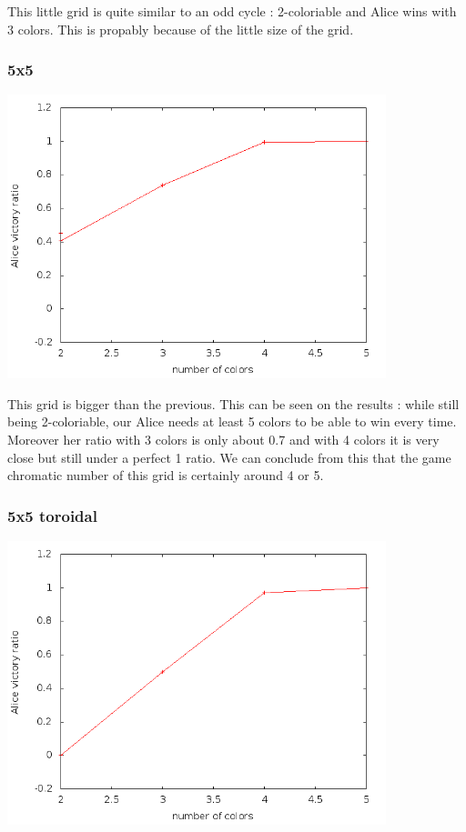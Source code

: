 This little grid is quite similar to an odd cycle : 2-coloriable and Alice wins with 3 colors. This is propably because of the little size of the grid.

\subsubsection{5x5}

\includegraphics[width=11cm]{resultats/grille55.png}

This grid is bigger than the previous. This can be seen on the results : while still being 2-coloriable, our Alice needs at least 5 colors to be able to win every time. Moreover her ratio with 3 colors is only about 0.7 and with 4 colors it is very close but still under a perfect 1 ratio. We can conclude from this that the game chromatic number of this grid is certainly around 4 or 5.

\subsubsection{5x5 toroidal}

\includegraphics[width=11cm]{resultats/grilletor55.png}


